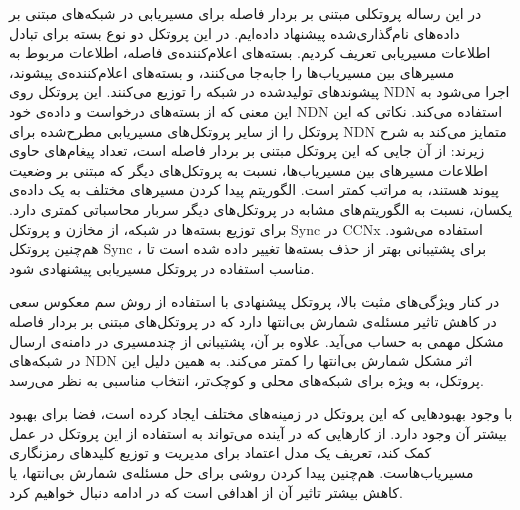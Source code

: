
در این رساله پروتکلی مبتنی بر بردار فاصله برای مسیریابی در شبکه‌های مبتنی بر داده‌های نام‌گذاری‌شده پیشنهاد داده‌ایم. در این پروتکل دو نوع بسته‌ برای تبادل اطلاعات مسیریابی تعریف کردیم. بسته‌های اعلام‌کننده‌ی فاصله‌، اطلاعات مربوط به مسیرهای بین مسیریاب‌ها را جابه‌جا می‌کنند، و بسته‌های اعلام‌کننده‌ی پیشوند، پیشوند‌های تولید‌شده در شبکه را توزیع می‌کنند. این پروتکل روی NDN اجرا می‌شود به این معنی که از بسته‌های درخواست و داده‌ی خود NDN استفاده می‌کند. نکاتی که این پروتکل را از سایر پروتکل‌های مسیریابی مطرح‌شده برای NDN متمایز می‌کند به شرح زیرند:
 از آن جایی که این پروتکل مبتنی بر بردار فاصله است، تعداد پیغام‌های حاوی اطلاعات مسیرهای بین مسیریاب‌ها، نسبت به پروتکل‌های دیگر که مبتنی بر وضعیت پیوند هستند، به مراتب کمتر است. 
 الگوریتم پیدا کردن مسیرهای مختلف به یک داده‌ی یکسان، نسبت به الگوریتم‌های مشابه در پروتکل‌های دیگر سربار محاسباتی کمتری دارد.
 برای توزیع بسته‌ها در شبکه، از مخازن و پروتکل Sync در CCNx استفاده می‌شود. هم‌چنین پروتکل Sync ، برای پشتیبانی بهتر از حذف بسته‌ها تغییر داده شده است تا مناسب استفاده در پروتکل مسیریابی پیشنهادی شود.

در کنار ویژگی‌های مثبت بالا، پروتکل پیشنهادی با استفاده از روش سم معکوس سعی در کاهش تاثیر مسئله‌ی شمارش بی‌انتها دارد که در پروتکل‌های مبتنی بر بردار فاصله مشکل مهمی به حساب می‌آید. علاوه بر آن، پشتیبانی از چندمسیری در دامنه‌ی ارسال در شبکه‌های NDN اثر مشکل شمارش بی‌انتها را کمتر می‌کند. به همین دلیل این پروتکل، به ویژه برای شبکه‌های محلی و کوچک‌تر، انتخاب مناسبی به نظر می‌رسد.

با وجود بهبودهایی که این پروتکل در زمینه‌های مختلف ایجاد کرده است، فضا برای بهبود بیشتر آن وجود دارد. از کارهایی که در آینده می‌تواند به استفاده از این پروتکل در عمل کمک کند، تعریف یک مدل اعتماد برای مدیریت و توزیع کلید‌های رمزنگاری مسیریاب‌هاست. هم‌چنین پیدا کردن روشی برای حل مسئله‌ی شمارش بی‌انتها، یا کاهش بیشتر تاثیر آن از اهدافی است که در ادامه دنبال خواهیم کرد.

